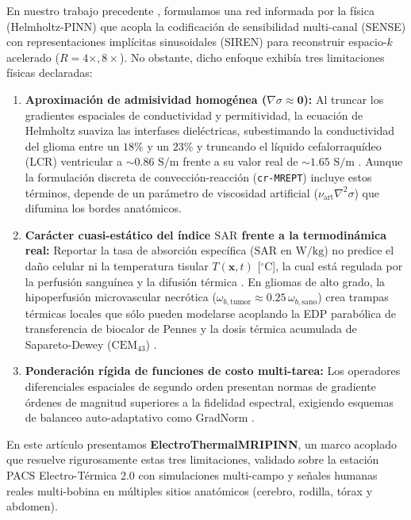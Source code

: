 \documentclass[9pt]{article}
\begin{document}
En nuestro trabajo precedente \parencite{Leijsen2021}, formulamos una red informada por la física (Helmholtz-PINN) que acopla la codificación de sensibilidad multi-canal (SENSE) \parencite{Pruessmann1999, Uecker2014} con representaciones implícitas sinusoidales (SIREN) \parencite{Sitzmann2020, Raissi2019} para reconstruir espacio-$k$ acelerado ($R=4\times, 8\times$). No obstante, dicho enfoque exhibía tres limitaciones físicas declaradas:
\begin{enumerate}
    \item \textbf{Aproximación de admisividad homogénea ($\nabla\sigma \approx \mathbf{0}$):} Al truncar los gradientes espaciales de conductividad y permitividad, la ecuación de Helmholtz suaviza las interfases dieléctricas, subestimando la conductividad del glioma entre un $18\%$ y un $23\%$ y truncando el líquido cefalorraquídeo (LCR) ventricular a $\sim 0.86\text{ S/m}$ frente a su valor real de $\sim 1.65\text{ S/m}$ \parencite{Mandija2018, Seo2012}. Aunque la formulación discreta de convección-reacción (\texttt{cr-MREPT}) \parencite{Hafalir2014, Gurler2017} incluye estos términos, depende de un parámetro de viscosidad artificial ($\nu_{\text{art}}\nabla^2\sigma$) que difumina los bordes anatómicos.
    \item \textbf{Carácter cuasi-estático del índice $\text{SAR}$ frente a la termodinámica real:} Reportar la tasa de absorción específica ($\text{SAR}$ en $\text{W/kg}$) no predice el daño celular ni la temperatura tisular $T(\mathbf{x}, t)$ [$^\circ\text{C}$], la cual está regulada por la perfusión sanguínea y la difusión térmica \parencite{Pennes1948, IEC60601}. En gliomas de alto grado, la hipoperfusión microvascular necrótica ($\omega_{b,\text{tumor}} \approx 0.25\,\omega_{b,\text{sano}}$) \parencite{Vaupel1989} crea trampas térmicas locales que sólo pueden modelarse acoplando la EDP parabólica de transferencia de biocalor de Pennes y la dosis térmica acumulada de Sapareto-Dewey ($\text{CEM}_{43}$) \parencite{Sapareto1984}.
    \item \textbf{Ponderación rígida de funciones de costo multi-tarea:} Los operadores diferenciales espaciales de segundo orden presentan normas de gradiente órdenes de magnitud superiores a la fidelidad espectral, exigiendo esquemas de balanceo auto-adaptativo como GradNorm \parencite{Wang2021}.
\end{enumerate}

En este artículo presentamos \textbf{ElectroThermalMRIPINN}, un marco acoplado que resuelve rigurosamente estas tres limitaciones, validado sobre la estación PACS Electro-Térmica 2.0 con simulaciones multi-campo y señales humanas reales multi-bobina en múltiples sitios anatómicos (cerebro, rodilla, tórax y abdomen).
\end{document}
